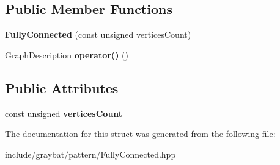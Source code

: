 \subsection*{Public Member Functions}
\begin{DoxyCompactItemize}
\item 
\hypertarget{structgraybat_1_1pattern_1_1FullyConnected_a26d7c666e0a985a78a599d29b6f6c0f7}{}{\bfseries Fully\+Connected} (const unsigned vertices\+Count)\label{structgraybat_1_1pattern_1_1FullyConnected_a26d7c666e0a985a78a599d29b6f6c0f7}

\item 
\hypertarget{structgraybat_1_1pattern_1_1FullyConnected_a399a1297451f74a42912d55d350351d3}{}Graph\+Description {\bfseries operator()} ()\label{structgraybat_1_1pattern_1_1FullyConnected_a399a1297451f74a42912d55d350351d3}

\end{DoxyCompactItemize}
\subsection*{Public Attributes}
\begin{DoxyCompactItemize}
\item 
\hypertarget{structgraybat_1_1pattern_1_1FullyConnected_affa342304fce94cff7b39870487ff985}{}const unsigned {\bfseries vertices\+Count}\label{structgraybat_1_1pattern_1_1FullyConnected_affa342304fce94cff7b39870487ff985}

\end{DoxyCompactItemize}


The documentation for this struct was generated from the following file\+:\begin{DoxyCompactItemize}
\item 
include/graybat/pattern/Fully\+Connected.\+hpp\end{DoxyCompactItemize}
